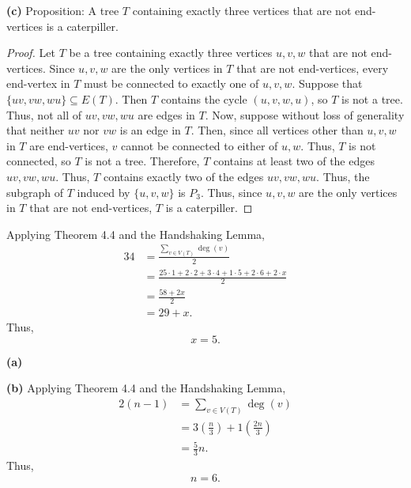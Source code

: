 \documentclass[12pt]{article}
\begin{document}
{\bf (c)} Proposition: A tree $T$ containing exactly three vertices that are not end-vertices is a caterpiller.
\begin{proof}
    Let $T$ be a tree containing exactly three vertices $u,v,w$ that are not end-vertices.
    Since $u,v,w$ are the only vertices in $T$ that are not end-vertices, every end-vertex in $T$ must be connected to exactly one of $u,v,w$.
    Suppose that $\{uv, vw, wu\} \subseteq E(T)$. 
    Then $T$ contains the cycle $(u,v,w,u)$, so $T$ is not a tree.
    Thus, not all of $uv, vw, wu$ are edges in $T$.
    Now, suppose without loss of generality that neither $uv$ nor $vw$ is an edge in $T$.
    Then, since all vertices other than $u,v,w$ in $T$ are end-vertices, $v$ cannot be connected to either of $u,w$.
    Thus, $T$ is not connected, so $T$ is not a tree.
    Therefore, $T$ contains at least two of the edges $uv, vw, wu$.
    Thus, $T$ contains exactly two of the edges $uv, vw, wu$.
    Thus, the subgraph of $T$ induced by $\{u,v,w\}$ is $P_3$.
    Thus, since $u,v,w$ are the only vertices in $T$ that are not end-vertices, $T$ is a caterpiller.
\end{proof}

\newpage{}
Applying Theorem 4.4 and the Handshaking Lemma,
\begin{align*}
    34 &= \frac{\sum\limits_{v \in V(T)} \deg(v)}2 \\
       &= \frac{25 \cdot 1 + 2 \cdot 2 + 3 \cdot 4 + 1 \cdot 5 + 2 \cdot 6 + 2 \cdot x}2 \\
       &= \frac{58+2x}2 \\
       &= 29 + x.
\end{align*}
Thus, $$x = 5.$$

\newpage{}

{\bf (a)}
\begin{center}
\end{center}

{\bf (b)}
Applying Theorem 4.4 and the Handshaking Lemma,
\begin{align*}
    2(n-1) &= \sum_{v \in V(T)} \deg(v) \\
           &= 3\left(\frac n3\right) + 1\left(\frac{2n}3\right) \\
           &= \frac53n.
\end{align*}
Thus, $$n=6.$$
\end{document}
